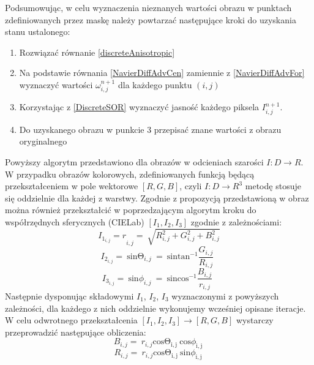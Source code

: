 \documentclass[12pt, twoside, openany]{report}
\theoremstyle{definition}
\begin{document}
\par
Podsumowując, w celu wyznaczenia nieznanych wartości obrazu w punktach zdefiniowanych przez maskę należy powtarzać następujące kroki do uzyskania stanu ustalonego:
\begin{enumerate}
\item
Rozwiązać równanie \eqref{discreteAnisotropic} 
\item
Na podstawie równania \eqref{NavierDiffAdvCen} zamiennie z \eqref{NavierDiffAdvFor} wyznaczyć wartości $\omega_{i,j}^{n+1}$ dla każdego punktu $(i,j)$ 
\item
Korzystając z \eqref{DiscreteSOR} wyznaczyć jasność każdego piksela $I_{i,j}^{n+1}$.
\item
Do uzyskanego obrazu w punkcie 3 przepisać znane wartości z obrazu oryginalnego
\end{enumerate}
Powyższy algorytm przedstawiono dla obrazów w odcieniach szarości $I:D\to R$. W przypadku obrazów kolorowych, zdefiniowanych funkcją będącą przekształceniem w pole wektorowe $[R,G,B]$, czyli $I:D\to R^3$ metodę stosuje się oddzielnie dla każdej z warstwy. Zgodnie z propozycją przedstawioną w \cite{fishelov2006image} obraz można również przekształcić w poprzedzającym algorytm kroku do współrzędnych sferycznych (CIELab) $\left[I_{1},I_{2},I_{3} \right]$ zgodnie z zależnościami:
\begin{equation}
{I_{1_{i,j}}=r}_{i,j}=\ \sqrt{R^2_{i,j}+G^2_{i,j}+B^2_{i,j}}
\label{TIone}
\end{equation}
\begin{equation}
I_{2_{i,j}}=\ {\mathrm{sin} {\mathrm{\Theta }}_{i,j}\ }=\ {\mathrm{sin} {{\mathrm{tan}}^{-1} \frac{G_{i,j}}{R_{i,j}}\ }\ } 
\label{TItwo}
\end{equation}
\begin{equation}
I_{3_{i,j}}=\ {\mathrm{sin} {\phi }_{i,j}\ }=\ {\mathrm{sin} {{\mathrm{cos}}^{-1} \frac{B_{i,j}}{r_{i,j}}\ }\ } 
\label{TIthree}
\end{equation}
Następnie dysponując składowymi $I_1$, $I_2$, $I_3$ wyznaczonymi z powyższych zależności, dla każdego z nich oddzielnie wykonujemy wcześniej opisane iteracje. W celu odwrotnego przekształcenia $\left[I_1,I_2,I_3 \right]\to\left[R,G,B\right]$ wystarczy przeprowadzić następujące obliczenia:
\begin{equation}
 B_{i,j}=\ r_{i,j}{\mathrm{cos} {\mathrm{\Theta }}_{\mathrm{i,j}}\ }{\mathrm{cos} {\phi }_{\mathrm{i,j}}\ }
\label{TInvIone}
\end{equation}
\begin{equation}
R_{i,j}=\ r_{i,j}{\mathrm{cos} {\mathrm{\Theta }}_{\mathrm{i,j}}\ }{\mathrm{sin} {\phi }_{\mathrm{i,j}}\ }
\label{TInvItwo}
\end{equation}
\end{document}

